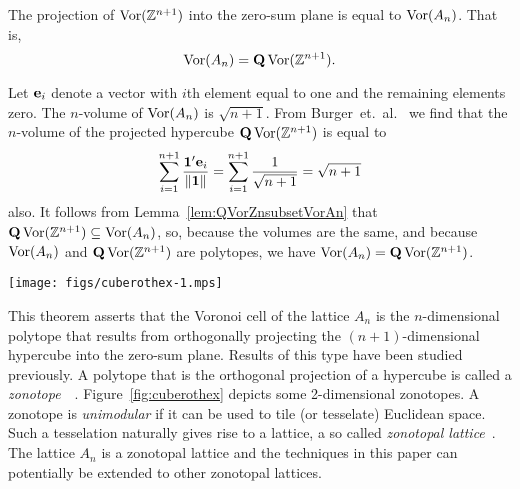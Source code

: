 \documentclass[journal]{IEEEtran}
\begin{document}
\begin{theorem}  \label{thm:VorAn=QVorZn1}
The projection of $\operatorname{Vor}({\mathbb Z}^{n+1})$ into the zero-sum plane is equal to $\operatorname{Vor}(A_{n})$. That is,
\[
\operatorname{Vor}(A_n) = \mathbf{Q}\operatorname{Vor}({\mathbb Z}^{n+1}).
\]
\end{theorem}
\begin{IEEEproof}
Let $\mathbf{e}_i$ denote a vector with $i$th element equal to one and the remaining elements zero.  The $n$-volume of $\operatorname{Vor}(A_n)$ is $\sqrt{n + 1}$.  From Burger~et.~al.~\cite[Theorem 1.1]{Burger1996} we find that the $n$-volume of the projected hypercube $\mathbf{Q}\operatorname{Vor}({\mathbb Z}^{n+1})$ is equal to
\[
\sum_{i = 1}^{n+1} \frac{\boldsymbol{1}^\prime \mathbf{e}_i}{\|\boldsymbol{1}\|} =  \sum_{i = 1}^{n+1} \frac{1}{\sqrt{n+1}} = \sqrt{n + 1}
\]
also. It follows from Lemma~\ref{lem:QVorZnsubsetVorAn} that $\mathbf{Q}\operatorname{Vor}({\mathbb Z}^{n+1}) \subseteq \operatorname{Vor}(A_n)$, so, because the volumes are the same, and because $\operatorname{Vor}(A_n)$ and $\mathbf{Q}\operatorname{Vor}({\mathbb Z}^{n+1})$ are polytopes, we have $\operatorname{Vor}(A_n) = \mathbf{Q}\operatorname{Vor}({\mathbb Z}^{n+1})$.
\end{IEEEproof}

\begin{figure*}[tp]
	\centering
		\texttt{[image: figs/cuberothex-1.mps]}
		\caption{Orthogonal projection of a cube as it is rotated about its center.  The figure on the left is the view of a cube from side on, and the boundary is a square.  When the cube is rotated the boundary becomes a hexagon.  The hexagon is regular when the cube is viewed along one of its vertices (the rightmost figure).  The regular hexagon is the Voronoi cell of the hexagonal lattice $A_2$ (see~Figure~\ref{fig:hexlatfig}).  Every 2-dimensional zonotope is also unimodular so the boundary of each of the figures above can be used to tile 2-dimensional Euclidean space~\cite{McMullen_space_tiling_zonotopes_1975}.}
		\label{fig:cuberothex}
\end{figure*}

This theorem asserts that the Voronoi cell of the lattice $A_n$ is the $n$-dimensional polytope that results from orthogonally projecting the $(n+1)$-dimensional hypercube into the zero-sum plane.  Results of this type have been studied previously.  A polytope that is the orthogonal projection of a hypercube is called a \emph{zonotope}~\cite[p.~313]{surveys_combin_zonotopes_1997}~\cite{McMullen_space_tiling_zonotopes_1975}.  Figure~\ref{fig:cuberothex} depicts some 2-dimensional zonotopes.  A zonotope is \emph{unimodular} if it can be used to tile (or tesselate) Euclidean space.  Such a tesselation naturally gives rise to a lattice, a so called \emph{zonotopal lattice}~\cite{Vallentin_space_tiling_zonotope_2004}.  The lattice $A_n$ is a zonotopal lattice and the techniques in this paper can potentially be extended to other zonotopal lattices. 
\end{document}
